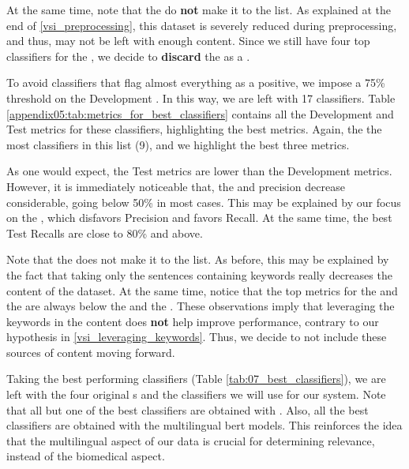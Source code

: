 At the same time, note that the \keyphrasesAbstractOnly{} do \textbf{not} make it to the list. As explained at the end of \headerName{} \ref{vsi_preprocessing}, this dataset is severely reduced during preprocessing, and thus, may not be left with enough content. Since we still have four top classifiers for the \trafilaturaAbstract{}, we decide to \textbf{discard} the \keyphrasesAbstractOnly{} as a \contentType{}.

To avoid classifiers that flag almost everything as a positive, we impose a 75\% threshold on the Development \fOne{}. In this way, we are left with 17 classifiers. Table \ref{appendix05:tab:metrics_for_best_classifiers} contains all the Development and Test metrics for these classifiers, highlighting the best metrics. Again, the \trafilaturaFulltext{} the most classifiers in this list (9), and we highlight the best three metrics. 

As one would expect, the Test metrics are lower than the Development metrics. However, it is immediately noticeable that, the \fOne{} and precision decrease considerable, going below 50\% in most cases. This may be explained by our focus on the \fTwo{}, which disfavors Precision and favors Recall. At the same time, the best Test Recalls are close to 80\% and above.

Note that the \keyphrasesFulltextOnly{} does not make it to the list. As before, this may be explained by the fact that taking only the sentences containing keywords really decreases the content of the dataset. At the same time, notice that the top metrics for the \keyphrasesAbstractOC{} and the \keyphrasesFulltextOC{} are always below the \trafilaturaAbstract{} and the \trafilaturaFulltext{}. These observations imply that leveraging the keywords in the content does \textbf{not} help improve performance, contrary to our hypothesis in \headerName{} \ref{vsi_leveraging_keywords}. Thus, we decide to not include these sources of content moving forward.

Taking the best performing classifiers (Table \ref{tab:07_best_classifiers}), we are left with the four original \contentType{}s and the classifiers we will use for our system. Note that all but one of the best classifiers are obtained with \petThousand{}. Also, all the best classifiers are obtained with the multilingual \gls{bert} models. This reinforces the idea that the multilingual aspect of our data is crucial for determining relevance, instead of the biomedical aspect.



